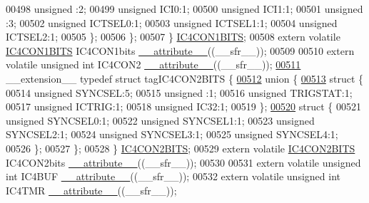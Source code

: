 \begin{DoxyCode}
00498       \textcolor{keywordtype}{unsigned} :2;
00499       \textcolor{keywordtype}{unsigned} ICI0:1;
00500       \textcolor{keywordtype}{unsigned} ICI1:1;
00501       \textcolor{keywordtype}{unsigned} :3;
00502       \textcolor{keywordtype}{unsigned} ICTSEL0:1;
00503       \textcolor{keywordtype}{unsigned} ICTSEL1:1;
00504       \textcolor{keywordtype}{unsigned} ICTSEL2:1;
00505     \};
00506   \};
00507 \} \hyperlink{a00008_dc/d8e/a00473}{IC4CON1BITS};
00508 \textcolor{keyword}{extern} \textcolor{keyword}{volatile} \hyperlink{a00008_dc/d8e/a00473}{IC4CON1BITS} IC4CON1bits \hyperlink{a00009_a493c46f03454991ccc5aa7a6e1dfb2a7}{\_\_attribute\_\_}((\_\_sfr\_\_));
00509 
00510 \textcolor{keyword}{extern} \textcolor{keyword}{volatile} \textcolor{keywordtype}{unsigned} \textcolor{keywordtype}{int}  IC4CON2 \hyperlink{a00009_a493c46f03454991ccc5aa7a6e1dfb2a7}{\_\_attribute\_\_}((\_\_sfr\_\_));
\hypertarget{a00009_source_l00511}{}\hyperlink{a00008}{00511} \_\_extension\_\_ \textcolor{keyword}{typedef} \textcolor{keyword}{struct }tagIC4CON2BITS \{
\hypertarget{a00009_source_l00512}{}\hyperlink{a00009}{00512}   \textcolor{keyword}{union }\{
\hypertarget{a00009_source_l00513}{}\hyperlink{a00009}{00513}     \textcolor{keyword}{struct }\{
00514       \textcolor{keywordtype}{unsigned} SYNCSEL:5;
00515       \textcolor{keywordtype}{unsigned} :1;
00516       \textcolor{keywordtype}{unsigned} TRIGSTAT:1;
00517       \textcolor{keywordtype}{unsigned} ICTRIG:1;
00518       \textcolor{keywordtype}{unsigned} IC32:1;
00519     \};
\hypertarget{a00009_source_l00520}{}\hyperlink{a00009}{00520}     \textcolor{keyword}{struct }\{
00521       \textcolor{keywordtype}{unsigned} SYNCSEL0:1;
00522       \textcolor{keywordtype}{unsigned} SYNCSEL1:1;
00523       \textcolor{keywordtype}{unsigned} SYNCSEL2:1;
00524       \textcolor{keywordtype}{unsigned} SYNCSEL3:1;
00525       \textcolor{keywordtype}{unsigned} SYNCSEL4:1;
00526     \};
00527   \};
00528 \} \hyperlink{a00008_d9/d34/a00476}{IC4CON2BITS};
00529 \textcolor{keyword}{extern} \textcolor{keyword}{volatile} \hyperlink{a00008_d9/d34/a00476}{IC4CON2BITS} IC4CON2bits \hyperlink{a00009_a493c46f03454991ccc5aa7a6e1dfb2a7}{\_\_attribute\_\_}((\_\_sfr\_\_));
00530 
00531 \textcolor{keyword}{extern} \textcolor{keyword}{volatile} \textcolor{keywordtype}{unsigned} \textcolor{keywordtype}{int}  IC4BUF \hyperlink{a00009_a493c46f03454991ccc5aa7a6e1dfb2a7}{\_\_attribute\_\_}((\_\_sfr\_\_));
00532 \textcolor{keyword}{extern} \textcolor{keyword}{volatile} \textcolor{keywordtype}{unsigned} \textcolor{keywordtype}{int}  IC4TMR \hyperlink{a00009_a493c46f03454991ccc5aa7a6e1dfb2a7}{\_\_attribute\_\_}((\_\_sfr\_\_));

\end{DoxyCode}
